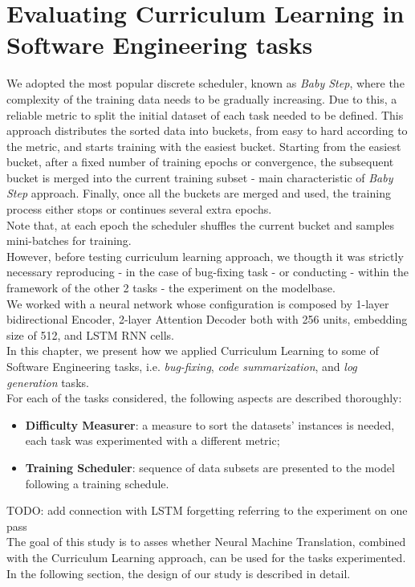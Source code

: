 \chapter{Evaluating Curriculum Learning in Software Engineering tasks}
\label{chapter:chap4}
We adopted the most popular discrete scheduler, known as \textit{Baby Step}, where the complexity of the training
data needs to be gradually increasing. Due to this, a reliable metric to split the initial dataset of each task needed to be defined.
This approach distributes the sorted data into buckets, from easy to hard according to the metric, and starts training with the easiest bucket. 
Starting from the easiest bucket, after a fixed number of training epochs or convergence, the subsequent bucket is merged
into the current training subset - main characteristic of \textit{Baby Step} approach.
Finally, once all the buckets are merged and used, the
training process either stops or continues several extra epochs.\\
Note that, at each epoch the scheduler shuffles the current bucket and samples mini-batches for training.\\
\newline
However, before testing curriculum learning approach, we thougth it was strictly necessary reproducing - in the case 
of bug-fixing task - or conducting -  within the framework of the other 2 tasks - the experiment on the modelbase.\\
We worked with a neural network whose configuration is composed by 1-layer bidirectional Encoder, 2-layer Attention 
Decoder both with 256 units, embedding size of 512, and LSTM RNN cells.\\
\newline
In this chapter, we present how we applied Curriculum Learning to some of Software
Engineering tasks, i.e. \textit{bug-fixing}, \textit{code summarization}, and \textit{log generation}
tasks. \\
For each of the tasks considered, the following aspects are described thoroughly:
\begin{itemize}
    \item \textbf{Difficulty Measurer}: a measure to sort the datasets' instances is needed, each task was experimented with a different metric; 
    \item \textbf{Training Scheduler}: sequence of data subsets are presented to the model following a training schedule.
\end{itemize}
TODO: add connection with LSTM forgetting referring to the experiment on one pass\\
\newline
The goal of this study is to asses whether Neural Machine Translation, combined with the Curriculum Learning approach, 
can be used for the tasks experimented. In the following section, the design of our study is described in detail.


